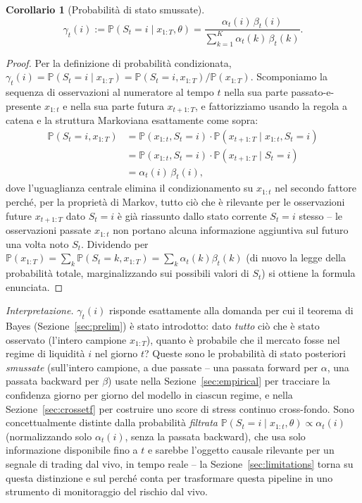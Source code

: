 \documentclass[11pt]{article}
\newtheorem{corollary}[theorem]{Corollario}
\theoremstyle{definition}
\theoremstyle{remark}
\begin{document}
\begin{corollary}[Probabilit\`a di stato smussate]
\label{cor:smoothed}
\[
\gamma_t(i) := \mathbb{P}(S_t=i\mid x_{1:T},\theta) = \frac{\alpha_t(i)\,\beta_t(i)}{\sum_{k=1}^K\alpha_t(k)\,\beta_t(k)}.
\]
\end{corollary}
\begin{proof}
Per la definizione di probabilit\`a condizionata, $\gamma_t(i)=\mathbb{P}(S_t=i\mid x_{1:T})=\mathbb{P}(S_t=i,x_{1:T})/\mathbb{P}(x_{1:T})$. Scomponiamo la sequenza di osservazioni al numeratore al tempo $t$ nella sua parte passato-e-presente $x_{1:t}$ e nella sua parte futura $x_{t+1:T}$, e fattorizziamo usando la regola a catena e la struttura Markoviana esattamente come sopra:
\begin{align*}
\mathbb{P}(S_t=i,x_{1:T}) &= \mathbb{P}(x_{1:t},S_t=i)\cdot\mathbb{P}(x_{t+1:T}\mid x_{1:t},S_t=i) \\
&= \mathbb{P}(x_{1:t},S_t=i)\cdot\mathbb{P}(x_{t+1:T}\mid S_t=i) \\
&= \alpha_t(i)\,\beta_t(i),
\end{align*}
dove l'uguaglianza centrale elimina il condizionamento su $x_{1:t}$ nel secondo fattore perch\'e, per la propriet\`a di Markov, tutto ci\`o che \`e rilevante per le osservazioni future $x_{t+1:T}$ dato $S_t=i$ \`e gi\`a riassunto dallo stato corrente $S_t=i$ stesso -- le osservazioni passate $x_{1:t}$ non portano alcuna informazione aggiuntiva sul futuro una volta noto $S_t$. Dividendo per $\mathbb{P}(x_{1:T})=\sum_k\mathbb{P}(S_t=k,x_{1:T})=\sum_k\alpha_t(k)\beta_t(k)$ (di nuovo la legge della probabilit\`a totale, marginalizzando sui possibili valori di $S_t$) si ottiene la formula enunciata.
\end{proof}
\emph{Interpretazione.} $\gamma_t(i)$ risponde esattamente alla domanda per cui il teorema di Bayes (Sezione~\ref{sec:prelim}) \`e stato introdotto: dato \emph{tutto} ci\`o che \`e stato osservato (l'intero campione $x_{1:T}$), quanto \`e probabile che il mercato fosse nel regime di liquidit\`a $i$ nel giorno $t$? Queste sono le probabilit\`a di stato posteriori \emph{smussate} (sull'intero campione, a due passate -- una passata forward per $\alpha$, una passata backward per $\beta$) usate nella Sezione~\ref{sec:empirical} per tracciare la confidenza giorno per giorno del modello in ciascun regime, e nella Sezione~\ref{sec:crossetf} per costruire uno score di stress continuo cross-fondo. Sono concettualmente distinte dalla probabilit\`a \emph{filtrata} $\mathbb{P}(S_t=i\mid x_{1:t},\theta)\propto\alpha_t(i)$ (normalizzando solo $\alpha_t(i)$, senza la passata backward), che usa solo informazione disponibile fino a $t$ e sarebbe l'oggetto causale rilevante per un segnale di trading dal vivo, in tempo reale -- la Sezione~\ref{sec:limitations} torna su questa distinzione e sul perch\'e conta per trasformare questa pipeline in uno strumento di monitoraggio del rischio dal vivo.
\end{document}
